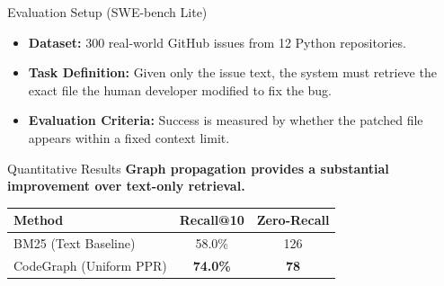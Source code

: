 \documentclass[aspectratio=169, xcolor={dvipsnames}]{beamer}
\begin{document}
\begin{frame}{Evaluation Setup (SWE-bench Lite)}
    \begin{itemize}
        \item \textbf{Dataset:} 300 real-world GitHub issues from 12 Python repositories.
        \item \textbf{Task Definition:} Given only the issue text, the system must retrieve the exact file the human developer modified to fix the bug.
        \item \textbf{Evaluation Criteria:} Success is measured by whether the patched file appears within a fixed context limit.
    \end{itemize}
    \vspace{0.4cm}
    \begin{center}
    \end{center}
\end{frame}

\begin{frame}{Quantitative Results}
    \textbf{Graph propagation provides a substantial improvement over text-only retrieval.}
    \vspace{0.8cm}
    \begin{center}
    \begin{tabular}{lcc}
        \toprule
        \textbf{Method} & \textbf{Recall@10} & \textbf{Zero-Recall} \\
        \midrule
        BM25 (Text Baseline) & 58.0\% & 126 \\
        CodeGraph (Uniform PPR) & \textbf{\textcolor{MutedTeal}{74.0\%}} & \textbf{\textcolor{MutedTeal}{78}} \\
        \bottomrule
    \end{tabular}
    \end{center}
\end{frame}
\end{document}
